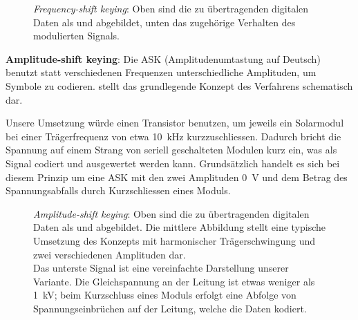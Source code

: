 \begin{figure}[h!tb]
    \centering
    
    \caption{%
        \emph{Frequency-shift  keying}: Oben   sind  die   zu  \"ubertragenden
        digitalen  Daten  als    und   abgebildet,  unten  das
        zugeh\"orige Verhalten des  modulierten Signals.%
    }
    \label{fig:fsk:concept}
\end{figure}


\textbf{Amplitude-shift  keying}: Die  ASK (Amplitudenumtastung  auf  Deutsch)
benutzt statt verschiedenen Frequenzen unterschiedliche Amplituden, um Symbole
zu  codieren.    stellt  das  grundlegende  Konzept  des
Verfahrens schematisch dar.

Unsere Umsetzung w\"urde einen Transistor  benutzen, um jeweils ein Solarmodul
bei  einer Tr\"agerfrequenz  von  etwa \SI{10}{\kilo\hertz}  kurzzuschliessen.
Dadurch bricht die Spannung auf  einem Strang von seriell geschalteten Modulen
kurz ein, was als Signal  codiert und ausgewertet werden kann. Grunds\"atzlich
handelt  es sich  bei  diesem Prinzip  um  eine ASK  mit  den zwei  Amplituden
\SI{0}{\volt} und  dem Betrag des Spannungsabfalls  durch Kurzschliessen eines
Moduls.

\begin{figure}[h!tb]
    \centering
    
    \caption{%
        \emph{Amplitude-shift  keying}: Oben   sind  die   zu  \"ubertragenden
        digitalen  Daten als   und   abgebildet. Die  mittlere
        Abbildung stellt eine typische Umsetzung des Konzepts mit harmonischer
        Tr\"agerschwingung und zwei verschiedenen Amplituden dar.\protect\\
        Das  unterste   Signal  ist  eine  vereinfachte   Darstellung  unserer
        Variante.  Die  Gleichspannung an  der Leitung  ist etwas  weniger als
        \SI{1}{\kilo\volt}; beim Kurzschluss eines Moduls erfolgt eine Abfolge
        von Spannungseinbr\"uchen auf der Leitung, welche die Daten kodiert.%
    }
    \label{fig:ask:concept}
\end{figure}

